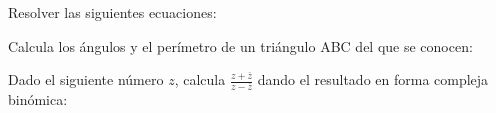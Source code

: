 \documentclass[addpoints,spanish, 12pt,a4paper]{exam}
\begin{document}
\begin{questions}
\begin{multicols}{1}
\begin{parts}
        \end{parts}
        \end{multicols}
        \question Resolver las siguientes ecuaciones:
        \begin{multicols}{1} 
        \end{multicols}
        \question Calcula los ángulos y el perímetro de un triángulo ABC del que se conocen:
        \begin{multicols}{1} 
        \end{multicols}
        \question Dado el siguiente número $z$, calcula $\frac{z+\overline{z}}{z-\overline{z}}$ dando el resultado en forma compleja binómica:
        \begin{multicols}{1} 
        \end{multicols}
        
    \end{questions}
    
\end{document}
